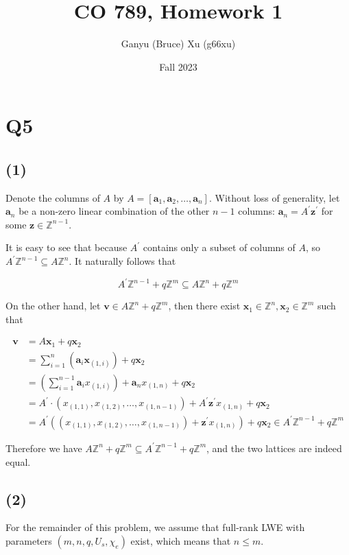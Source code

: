 \documentclass{article}
\title{CO 789, Homework 1}
\author{Ganyu (Bruce) Xu (g66xu)}
\date{Fall 2023}
\begin{document}

\section*{Q5}
\subsection*{(1)}
Denote the columns of $A$ by $A = [\mathbf{a}_1, \mathbf{a}_2, \ldots, \mathbf{a}_n]$. Without loss of generality, let $\mathbf{a}_n$ be a non-zero linear combination of the other $n-1$ columns: $\mathbf{a}_n = A^\prime \mathbf{z}^\prime$ for some $\mathbf{z} \in \mathbb{Z}^{n-1}$.

It is easy to see that because $A^\prime$ contains only a subset of columns of $A$, so $A^\prime\mathbb{Z}^{n-1} \subseteq A\mathbb{Z}^n$. It naturally follows that

$$
A^\prime\mathbb{Z}^{n-1} + q\mathbb{Z}^m \subseteq A\mathbb{Z}^n + q\mathbb{Z}^m
$$


On the other hand, let $\mathbf{v} \in A \mathbb{Z}^{n} + q\mathbb{Z}^m$, then there exist $\mathbf{x}_1 \in \mathbb{Z}^n, \mathbf{x}_2 \in \mathbb{Z}^m$ such that 

$$
\begin{aligned}
\mathbf{v} &= A\mathbf{x}_1 + q\mathbf{x}_2 \\
&= \sum_{i=1}^n(\mathbf{a}_i \mathbf{x}_{(1, i)}) + q\mathbf{x}_2 \\
&= (\sum_{i=1}^{n-1}\mathbf{a}_i x_{(1, i)}) + \mathbf{a}_n x_{(1, n)} + q\mathbf{x}_2 \\
&= A^\prime \cdot (x_{(1, 1)}, x_{(1, 2)}, \ldots, x_{(1, n-1)}) + A^\prime\mathbf{z}^\prime x_{(1, n)} + q\mathbf{x}_2 \\
&= A^\prime((x_{(1, 1)}, x_{(1, 2)}, \ldots, x_{(1, n-1)}) + \mathbf{z}^\prime x_{(1, n)}) + q\mathbf{x}_2 \in A^\prime\mathbb{Z}^{n-1} + q\mathbb{Z}^m
\end{aligned}
$$

Therefore we have $A\mathbb{Z}^{n} + q\mathbb{Z}^m \subseteq A^\prime\mathbb{Z}^{n-1} + q\mathbb{Z}^m$, and the two lattices are indeed equal.

\subsection*{(2)}
For the remainder of this problem, we assume that full-rank LWE with parameters $(m, n, q, U_s, \chi_e)$ exist, which means that $n \leq m$.
\end{document}
